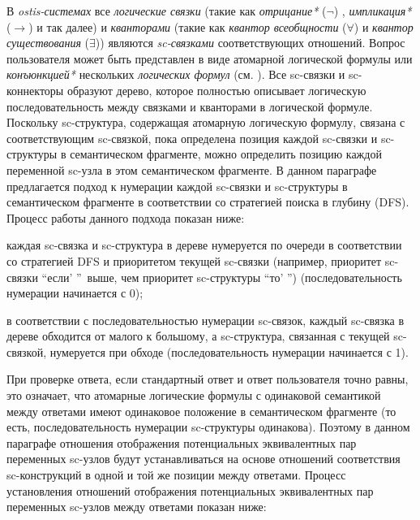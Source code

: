 В \textit{ostis-системах} все \textit{логические связки} (такие как \textit{отрицание*} ($\lnot$) , \textit{импликация*} ($\to$) и так далее) и \textit{кванторами} (такие как \textit{квантор всеобщности} ($\forall$) и \textit{квантор существования} ($\exists$)) являются \textit{sc-связками} соответствующих отношений. Вопрос пользователя может быть представлен в виде атомарной логической формулы или \textit{конъюнкцией*} нескольких \textit{логических формул} (см. ). Все sc-связки и sc-коннекторы образуют дерево, которое полностью описывает логическую последовательность между связками и кванторами в логической формуле. Поскольку sc-структура, содержащая атомарную логическую формулу, связана с соответствующим sc-связкой, пока определена позиция каждой sc-связки и sc-структуры в семантическом фрагменте, можно определить позицию каждой переменной sc-узла в этом семантическом фрагменте. В данном параграфе предлагается подход к нумерации каждой sc-связки и sc-структуры в семантическом фрагменте в соответствии со стратегией поиска в глубину (DFS). Процесс работы данного подхода показан ниже:

\begin{textitemize}
    \item каждая sc-связка и sc-структура в дереве нумеруется по очереди в соответствии со стратегией DFS и приоритетом текущей sc-связки (например, приоритет sc-связки ``если' ''\ выше, чем приоритет sc-структуры ``то' '') (последовательность нумерации начинается с 0);
	\item в соответствии с последовательностью нумерации sc-связок, каждый sc-связка в дереве обходится от малого к большому, а sc-структура, связанная с текущей sc-связкой, нумеруется при обходе (последовательность нумерации начинается с 1).
\end{textitemize}

При проверке ответа, если стандартный ответ и ответ пользователя точно равны, это означает, что атомарные логические формулы с одинаковой семантикой между ответами имеют одинаковое положение в семантическом фрагменте (то есть, последовательность нумерации sc-структуры одинакова). Поэтому в данном параграфе отношения отображения потенциальных эквивалентных пар переменных sc-узлов будут устанавливаться на основе отношений соответствия sc-конструкций в одной и той же позиции между ответами. Процесс установления отношений отображения потенциальных эквивалентных пар переменных sc-узлов между ответами показан ниже:

